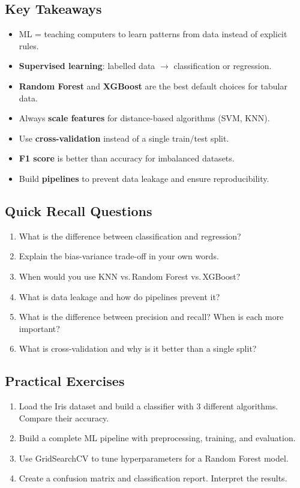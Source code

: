 \documentclass[12pt, a4paper, oneside]{book}
\begin{document}
\subsection{Key Takeaways}
\begin{itemize}[leftmargin=2em]
    \item ML = teaching computers to learn patterns from data instead of explicit rules.
    \item \textbf{Supervised learning}: labelled data $\to$ classification or regression.
    \item \textbf{Random Forest} and \textbf{XGBoost} are the best default choices for tabular data.
    \item Always \textbf{scale features} for distance-based algorithms (SVM, KNN).
    \item Use \textbf{cross-validation} instead of a single train/test split.
    \item \textbf{F1 score} is better than accuracy for imbalanced datasets.
    \item Build \textbf{pipelines} to prevent data leakage and ensure reproducibility.
\end{itemize}

\subsection{Quick Recall Questions}
\begin{enumerate}[leftmargin=2em]
    \item What is the difference between classification and regression?
    \item Explain the bias-variance trade-off in your own words.
    \item When would you use KNN vs.\,Random Forest vs.\,XGBoost?
    \item What is data leakage and how do pipelines prevent it?
    \item What is the difference between precision and recall? When is each more important?
    \item What is cross-validation and why is it better than a single split?
\end{enumerate}

\subsection{Practical Exercises}
\begin{enumerate}[leftmargin=2em]
    \item Load the Iris dataset and build a classifier with 3 different algorithms. Compare their accuracy.
    \item Build a complete ML pipeline with preprocessing, training, and evaluation.
    \item Use GridSearchCV to tune hyperparameters for a Random Forest model.
    \item Create a confusion matrix and classification report. Interpret the results.
\end{enumerate}
\end{document}
